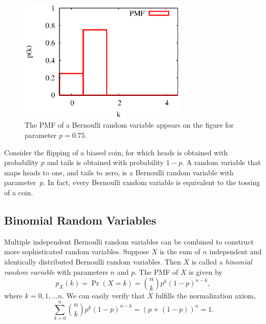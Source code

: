 \begin{figure}[ht]
\begin{center}
\includegraphics[width=8cm]{Figures/5chapter/bernoulli}
\end{center}
\caption{The PMF of a Bernoulli random variable appears on the figure for parameter $p = 0.75$.}
\end{figure}

\begin{example}
Consider the flipping of a biased coin, for which heads is obtained with probability $p$ and tails is obtained with probability $1-p$.
A random variable that maps heads to one, and tails to zero, is a Bernoulli random variable with parameter~$p$.
In fact, every Bernoulli random variable is equivalent to the tossing of a coin.
\end{example}


\subsection{Binomial Random Variables}

Multiple independent Bernoulli random variables can be combined to construct more sophisticated random variables.
Suppose $X$ is the sum of $n$ independent and identically distributed Bernoulli random variables.
Then $X$ is called a \emph{binomial random variable} with parameters $n$ and $p$. 
The PMF of $X$ is given by
\begin{equation*}
p_X (k) = \Pr (X = k)
= \binom{n}{k} p^k (1-p)^{n-k},
\end{equation*}
where $k = 0, 1, \ldots n$.
We can easily verify that $X$ fulfills the normalization axiom,
\begin{equation*}
\sum_{k=0}^n \binom{n}{k} p^k (1-p)^{n-k}
= \left( p + (1-p) \right)^n = 1.
\end{equation*}

